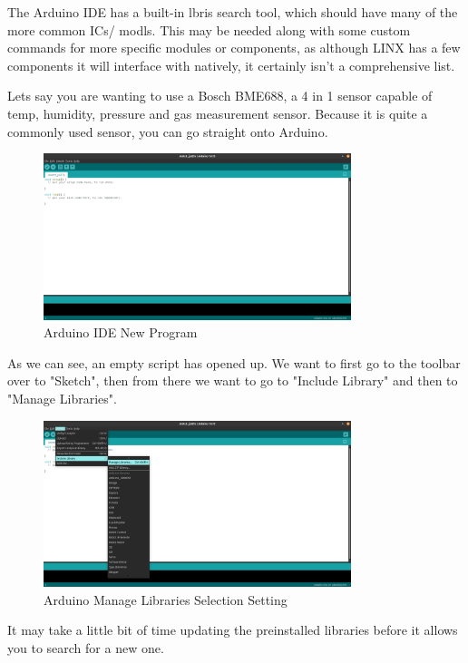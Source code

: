 \documentclass[a4paper,11pt]{report}
\begin{document}
The Arduino IDE has a built-in \gls{lbris} search tool, which should have many of the more common ICs/ \gls{modl}s. This may be needed along with some custom commands for more specific modules or components, as although LINX has a few components it will interface with natively, it certainly isn't a comprehensive list.

Lets say you are wanting to use a Bosch BME688, a 4 in 1 sensor capable of temp, humidity, pressure and gas measurement sensor. Because it is quite a commonly used sensor, you can go straight onto Arduino.

\begin{figure}[H]
\centering
\includegraphics[width=0.8\textwidth]{screenshots/arduinoidestartup}
\caption{Arduino IDE New Program}
\end{figure}

As we can see, an empty script has opened up. We want to first go to the toolbar over to "Sketch", then from there we want to go to "Include Library" and then to "Manage Libraries".

\begin{figure}[H]
\centering
\includegraphics[width=0.8\textwidth]{screenshots/arduinomanagelibrariesselect}
\caption{Arduino Manage Libraries Selection Setting}
\end{figure}

It may take a little bit of time updating the preinstalled libraries before it allows you to search for a new one.
\end{document}
